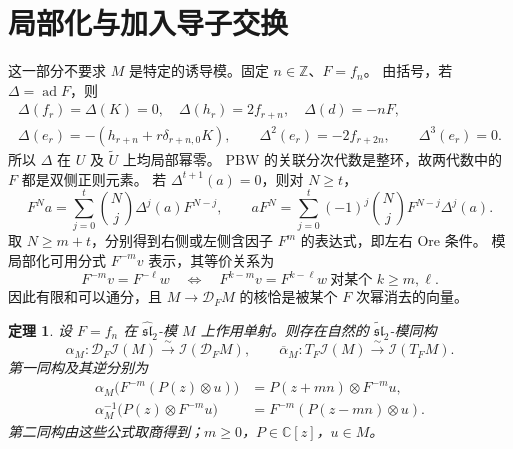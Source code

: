 \documentclass[UTF8,11pt]{ctexart}
\newcommand{\C}{\mathbb C}
\newcommand{\Z}{\mathbb Z}
\newcommand{\g}{\widehat{\mathfrak{sl}}_2}
\newcommand{\gt}{\widetilde{\mathfrak{sl}}_2}
\newcommand{\ad}{\operatorname{ad}}
\newcommand{\I}{\mathcal I}
\newcommand{\D}{\mathcal D}
\newtheorem{theorem}{定理}[section]
\theoremstyle{definition}
\begin{document}
\section{局部化与加入导子交换}

这一部分不要求 \(M\) 是特定的诱导模。固定 \(n\in\Z\)、\(F=f_n\)。
由括号，若 \(\Delta=\ad F\)，则
\[
\begin{gathered}
 \Delta(f_r)=\Delta(K)=0,\quad \Delta(h_r)=2f_{r+n},\quad \Delta(d)=-nF,\\
 \Delta(e_r)=-(h_{r+n}+r\delta_{r+n,0}K),\qquad
 \Delta^2(e_r)=-2f_{r+2n},\qquad \Delta^3(e_r)=0.
\end{gathered}
\]
所以 \(\Delta\) 在 \(U\) 及 \(\widetilde U\) 上均局部幂零。
PBW 的关联分次代数是整环，故两代数中的 \(F\) 都是双侧正则元素。
若 \(\Delta^{t+1}(a)=0\)，则对 \(N\ge t\)，
\[
 F^Na=\sum_{j=0}^t\binom Nj\Delta^j(a)F^{N-j},\qquad
 aF^N=\sum_{j=0}^t(-1)^j\binom NjF^{N-j}\Delta^j(a).
\]
取 \(N\ge m+t\)，分别得到右侧或左侧含因子 \(F^m\) 的表达式，即左右 Ore 条件。
模局部化可用分式 \(F^{-m}v\) 表示，其等价关系为
\[
 F^{-m}v=F^{-\ell}w
 \quad\Longleftrightarrow\quad
 F^{k-m}v=F^{k-\ell}w\ \text{对某个 }k\ge m,\ell.
\]
因此有限和可以通分，且 \(M\to\D_FM\) 的核恰是被某个 \(F\) 次幂消去的向量。

\begin{theorem}\label{thm:commute}
设 \(F=f_n\) 在 \(\g\)-模 \(M\) 上作用单射。则存在自然的 \(\gt\)-模同构
\[
 \alpha_M:\D_F\I(M)\xrightarrow{\sim}\I(\D_FM),\qquad
 \overline\alpha_M:T_F\I(M)\xrightarrow{\sim}\I(T_FM).
\]
第一同构及其逆分别为
\begin{equation}\label{eq:alpha}
\begin{aligned}
 \alpha_M\bigl(F^{-m}(P(z)\otimes u)\bigr)
   &=P(z+mn)\otimes F^{-m}u,\\
 \alpha_M^{-1}\bigl(P(z)\otimes F^{-m}u\bigr)
   &=F^{-m}(P(z-mn)\otimes u).
\end{aligned}
\end{equation}
第二同构由这些公式取商得到；\(m\ge0\)，\(P\in\C[z]\)，\(u\in M\)。
\end{theorem}
\end{document}
